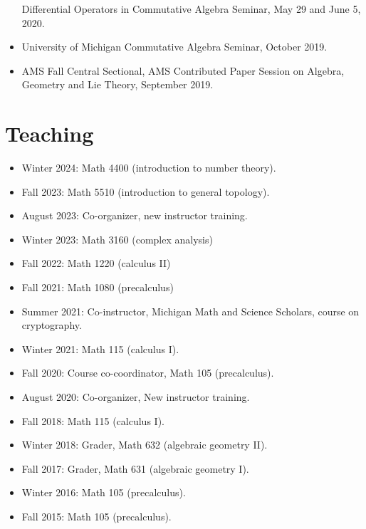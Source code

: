 \documentclass{res}
\begin{document}
\begin{resume}
\begin{itemize}
Differential Operators in Commutative Algebra Seminar, May 29 and June 5, 2020.
\item 
University of Michigan Commutative Algebra Seminar, October 2019.
\item 
AMS Fall Central Sectional, AMS Contributed Paper Session on Algebra, Geometry and Lie Theory, September 2019.
\end{itemize}


\section{Teaching}
\begin{itemize}
\item Winter 2024: Math 4400 (introduction to number theory).
\item Fall 2023: Math 5510 (introduction to general topology).
\item August 2023: Co-organizer, new instructor training.
\item Winter 2023: Math 3160 (complex analysis)
\item Fall 2022: Math 1220 (calculus II)
\item Fall 2021: Math 1080 (precalculus)
\item Summer 2021: Co-instructor, Michigan Math and Science Scholars, course on cryptography.
\item Winter 2021: Math 115 (calculus I).
\item Fall 2020: Course co-coordinator, Math 105 (precalculus).
\item August 2020: Co-organizer, New instructor training.
\item Fall 2018:  Math 115 (calculus I).
\item  Winter 2018: Grader, Math 632 (algebraic geometry II).
\item  Fall 2017: Grader, Math 631 (algebraic geometry I).
\item  Winter 2016:  Math 105 (precalculus).
\item  Fall 2015:  Math 105 (precalculus).
\end{itemize}


\end{resume}
\end{document}
